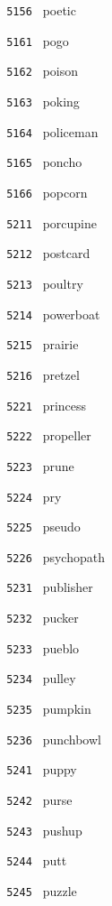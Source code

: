 \documentclass[11pt]{article}
\begin{document}
\begin{multicols}{6}
\noindent \texttt{ 5156 } poetic  \par
\vspace{3mm}
\noindent \texttt{ 5161 } pogo  \par
\noindent \texttt{ 5162 } poison  \par
\noindent \texttt{ 5163 } poking  \par
\noindent \texttt{ 5164 } policeman  \par
\noindent \texttt{ 5165 } poncho  \par
\noindent \texttt{ 5166 } popcorn  \par
\noindent \texttt{ 5211 } porcupine  \par
\noindent \texttt{ 5212 } postcard  \par
\noindent \texttt{ 5213 } poultry  \par
\noindent \texttt{ 5214 } powerboat  \par
\noindent \texttt{ 5215 } prairie  \par
\noindent \texttt{ 5216 } pretzel  \par
\vspace{3mm}
\noindent \texttt{ 5221 } princess  \par
\noindent \texttt{ 5222 } propeller  \par
\noindent \texttt{ 5223 } prune  \par
\noindent \texttt{ 5224 } pry  \par
\noindent \texttt{ 5225 } pseudo  \par
\noindent \texttt{ 5226 } psychopath  \par
\vspace{3mm}
\noindent \texttt{ 5231 } publisher  \par
\noindent \texttt{ 5232 } pucker  \par
\noindent \texttt{ 5233 } pueblo  \par
\noindent \texttt{ 5234 } pulley  \par
\noindent \texttt{ 5235 } pumpkin  \par
\noindent \texttt{ 5236 } punchbowl  \par
\vspace{3mm}
\noindent \texttt{ 5241 } puppy  \par
\noindent \texttt{ 5242 } purse  \par
\noindent \texttt{ 5243 } pushup  \par
\noindent \texttt{ 5244 } putt  \par
\noindent \texttt{ 5245 } puzzle  \par

\end{multicols}
\end{document}
